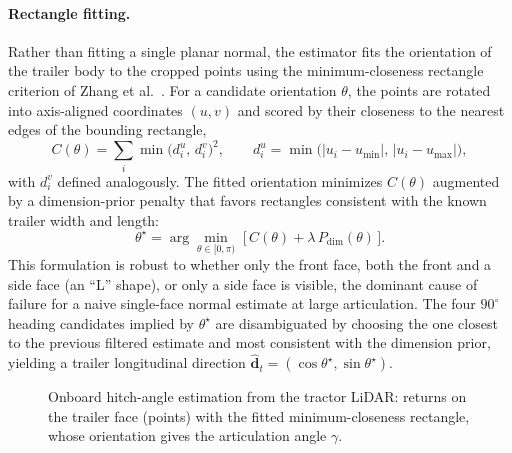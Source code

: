\paragraph{Rectangle fitting.} Rather than fitting a single planar normal, the estimator fits the orientation of the trailer body to the cropped points using the minimum-closeness rectangle criterion of Zhang et al.~\cite{zhang2017lshape}. For a candidate orientation $\theta$, the points are rotated into axis-aligned coordinates $(u, v)$ and scored by their closeness to the nearest edges of the bounding rectangle,
\begin{equation}
    C(\theta) = \sum_i \min\!\big(d^u_i,\, d^v_i\big)^2,
    \qquad
    d^u_i = \min\!\big(|u_i - u_\text{min}|,\, |u_i - u_\text{max}|\big),
    \label{eq:hitch_closeness}
\end{equation}
with $d^v_i$ defined analogously. The fitted orientation minimizes $C(\theta)$ augmented by a dimension-prior penalty that favors rectangles consistent with the known trailer width and length:
\begin{equation}
    \theta^\star = \arg\min_{\theta \in [0, \pi)} \;\big[\, C(\theta) + \lambda\, P_\text{dim}(\theta) \,\big].
    \label{eq:hitch_fit}
\end{equation}
This formulation is robust to whether only the front face, both the front and a side face (an ``L'' shape), or only a side face is visible, the dominant cause of failure for a naive single-face normal estimate at large articulation. The four $90^\circ$ heading candidates implied by $\theta^\star$ are disambiguated by choosing the one closest to the previous filtered estimate and most consistent with the dimension prior, yielding a trailer longitudinal direction $\hat{\mathbf{d}}_t = (\cos\theta^\star, \sin\theta^\star)$.

\begin{figure}[t]
  \centering
  \caption{Onboard hitch-angle estimation from the tractor LiDAR: returns on the trailer face (points) with the fitted minimum-closeness rectangle, whose orientation gives the articulation angle $\gamma$.}
  \label{fig:hitch_fit}
\end{figure}

